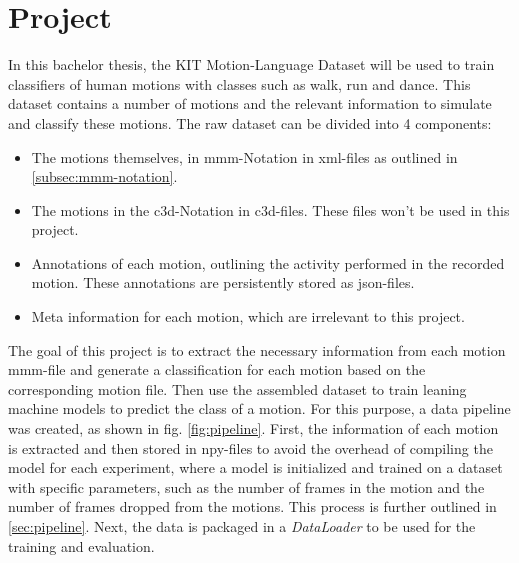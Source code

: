 \chapter{Project}\label{chap:project}
	In this bachelor thesis, the KIT Motion-Language Dataset\cite{Plappert2016} will be used to train classifiers of human motions with classes such as walk, run and dance. This dataset contains a number of motions and the relevant information to simulate and classify these motions. The raw dataset can be divided into 4 components:
	\begin{itemize}
		\item The motions themselves, in mmm-Notation in xml-files as outlined in \ref{subsec:mmm-notation}.
		\item The motions in the c3d-Notation in c3d-files. These files won't be used in this project.
		\item Annotations of each motion, outlining the activity performed in the recorded motion. These annotations are persistently stored as json-files.
		\item Meta information for each motion, which are irrelevant to this project.
	\end{itemize}
	The goal of this project is to extract the necessary information from each motion mmm-file and generate a classification for each motion based on the corresponding motion file. Then use the assembled dataset to train leaning machine models to predict the class of a motion. For this purpose, a data pipeline was created, as shown in fig. \ref{fig:pipeline}. First, the information of each motion is extracted and then stored in npy-files to avoid the overhead of compiling the model for each experiment, where a model is initialized and trained on a dataset with specific parameters, such as the number of frames in the motion and the number of frames dropped from the motions. This process is further outlined in \ref{sec:pipeline}. Next, the data is packaged in a \textit{DataLoader} to be used for the training and evaluation.
